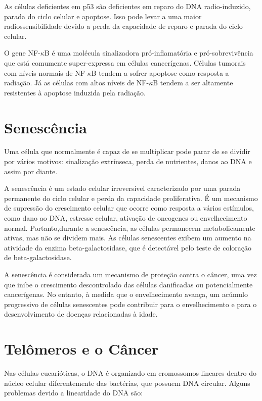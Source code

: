 \documentclass[11pt,a4paper]{article}
\begin{document}
    As células deficientes em p53 são deficientes em reparo do DNA radio-induzido, parada do ciclo celular e apoptose. Isso pode levar a uma maior radiossensibilidade devido a perda da capacidade de reparo e parada do ciclo celular. 

    O gene NF-$\kappa$B é uma molécula sinalizadora pró-inflamatória e pró-sobrevivência que está comumente super-expressa em células cancerígenas. Células tumorais com níveis normais de NF-$\kappa$B tendem a sofrer apoptose como resposta a radiação. Já as células com altos níveis de NF-$\kappa$B tendem a ser altamente resistentes à apoptose induzida pela radiação. 

\section{Senescência}

    Uma célula que normalmente é capaz de se multiplicar pode parar de se dividir por vários motivos: sinalização extrínseca, perda de nutrientes, danos ao DNA e assim por diante.

    A senescência é um estado celular irreversível caracterizado por uma parada permanente do ciclo celular e perda da capacidade proliferativa. É um mecanismo de supressão do crescimento celular que ocorre como resposta a vários estímulos, como dano ao DNA, estresse celular, ativação de oncogenes ou envelhecimento normal. Portanto,durante a senescência, as células permanecem metabolicamente ativas, mas não se dividem mais. As células senescentes exibem um aumento na atividade da enzima beta-galactosidase, que é detectável pelo teste de coloração de beta-galactosidase.

    A senescência é considerada um mecanismo de proteção contra o câncer, uma vez que inibe o crescimento descontrolado das células danificadas ou potencialmente cancerígenas. No entanto, à medida que o envelhecimento avança, um acúmulo progressivo de células senescentes pode contribuir para o envelhecimento e para o desenvolvimento de doenças relacionadas à idade.

\section{Telômeros e o Câncer}

    Nas células eucarióticas, o DNA é organizado em cromossomos lineares dentro do núcleo celular diferentemente das bactérias, que possuem DNA circular. Alguns problemas devido a linearidade do DNA são:
\end{document}
